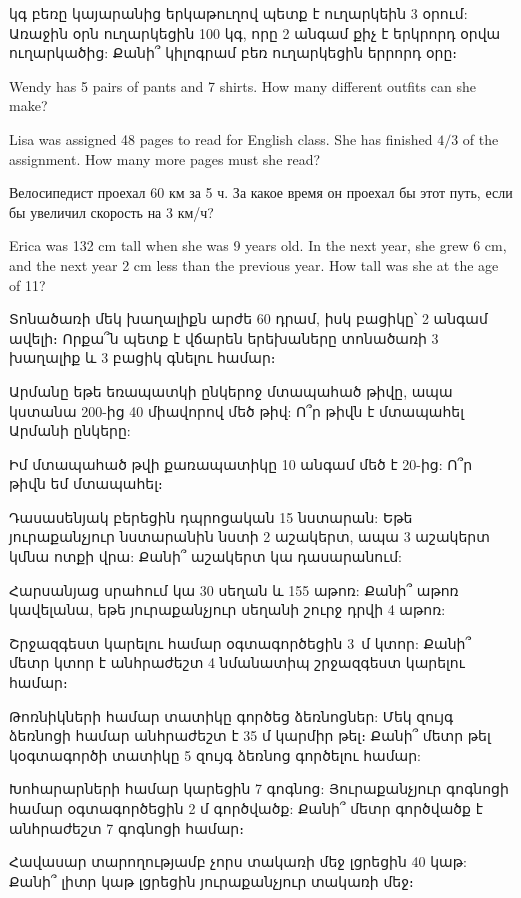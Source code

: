  կգ բեռը կայարանից երկաթուղով պետք է 
ուղարկեին 3 օրում: Առաջին օրն ուղարկեցին 100 կգ, որը 
2 անգամ քիչ է երկրորդ օրվա ուղարկածից: Քանի՞ կիլոգրամ 
բեռ ուղարկեցին երրորդ օրը։

\textproblem Wendy has 5 pairs of pants and 7 
shirts. How many different outfits can she make?

\textproblem Lisa was assigned 48 pages to read 
for English class. She has finished $4/3$ of
the assignment. How many more pages must she read?

\textproblem Велосипедист проехал 60 км за 5 ч. За 
какое время он проехал бы этот путь, если бы увеличил
скорость на 3 км/ч?


\textproblem Erica was 132 cm tall when she was 9 years 
old. In the next year, she grew 6 cm, and the next year 
2 cm less than the previous year. How tall was she at 
the age of 11?

\bye


\problem
Տոնածառի մեկ խաղալիքն արժե 60 դրամ, իսկ բացիկը՝ 2 
անգամ ավելի։ Որքա՞ն պետք է վճարեն երեխաները տոնածառի 
3 խաղալիք և 3 բացիկ գնելու համար։

\problem
Արմանը եթե եռապատկի ընկերոջ մտապահած թիվը, ապա կստանա 
200-ից 40 միավորով մեծ թիվ: Ո՞ր թիվն է մտապահել Արմանի 
ընկերը:

\problem
Իմ մտապահած թվի քառապատիկը 10 անգամ մեծ է 20-ից: Ո՞ր 
թիվն եմ մտապահել։

\problem
Դասասենյակ բերեցին դպրոցական 15 նստարան: Եթե յուրաքանչյուր 
նստարանին նստի 2 աշակերտ, ապա 3 աշակերտ կմնա ոտքի վրա: 
Քանի՞ աշակերտ կա դասարանում:

\problem
Հարսանյաց սրահում կա 30 սեղան և 155 աթոռ: Քանի՞ աթոռ 
կավելանա, եթե յուրաքանչյուր սեղանի շուրջ դրվի 4 աթոռ:


\problem
Շրջազգեստ կարելու համար օգտագործեցին 3~մ կտոր: Քանի՞ 
մետր կտոր է անհրաժեշտ 4 նմանատիպ շրջազգեստ կարելու համար։

\problem
Թոռնիկների համար տատիկը գործեց ձեռնոցներ: Մեկ զույգ 
ձեռնոցի համար անհրաժեշտ է 35 մ կարմիր թել։ Քանի՞ մետր 
թել կօգտագործի տատիկը 5 զույգ ձեռնոց գործելու համար:

\problem
Խոհարարների համար կարեցին 7 գոգնոց: Յուրաքանչյուր 
գոգնոցի համար օգտագործեցին 2 մ գործվածք: Քանի՞ մետր 
գործվածք է անհրաժեշտ 7 գոգնոցի համար։

\problem
Հավասար տարողությամբ չորս տակառի մեջ լցրեցին 40 կաթ: 
Քանի՞ լիտր կաթ լցրեցին յուրաքանչյուր տակառի մեջ։

